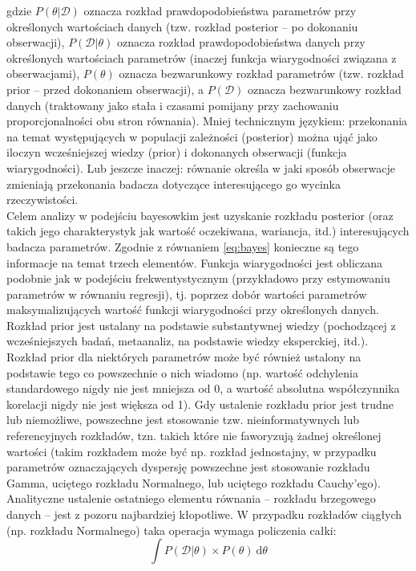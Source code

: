 \documentclass[man]{apa6}
\begin{document}
gdzie $P(\theta | \mathcal{D})$ oznacza rozkład prawdopodobieństwa parametrów przy określonych wartościach danych (tzw. rozkład posterior -- po dokonaniu obserwacji), $P(\mathcal{D} | \theta)$ oznacza rozkład prawdopodobieństwa danych przy określonych wartościach parametrów (inaczej funkcja wiarygodności związana z obserwacjami), $P(\theta)$ oznacza bezwarunkowy rozkład parametrów (tzw. rozkład prior -- przed dokonaniem obserwacji), a $P(\mathcal{D})$ oznacza bezwarunkowy rozkład danych (traktowany jako stała i czasami pomijany przy zachowaniu proporcjonalności obu stron równania). Mniej technicznym językiem: przekonania na temat występujących w populacji zależności (posterior) można ująć jako iloczyn wcześniejszej wiedzy (prior) i dokonanych obserwacji (funkcja wiarygodności). Lub jeszcze inaczej: równanie określa w jaki sposób obserwacje zmieniają przekonania badacza dotyczące interesującego go
wycinka rzeczywistości. \\
Celem analizy w podejściu bayesowkim jest uzyskanie rozkładu posterior (oraz takich jego charakterystyk jak wartość oczekiwana, wariancja, itd.) interesujących badacza parametrów. Zgodnie z równaniem \ref{eq:bayes} konieczne są tego informacje na temat trzech elementów. Funkcja wiarygodności jest obliczana podobnie jak w podejściu frekwentystycznym (przykładowo przy estymowaniu parametrów w równaniu regresji), tj. poprzez dobór wartości parametrów maksymalizujących wartość funkcji wiarygodności przy określonych danych. Rozkład prior jest ustalany na podstawie substantywnej wiedzy (pochodzącej z wcześniejszych badań, metaanaliz, na podstawie wiedzy eksperckiej, itd.). Rozkład prior dla niektórych parametrów może być również ustalony na podstawie tego co powszechnie o nich wiadomo (np. wartość odchylenia standardowego nigdy nie jest mniejsza od 0, a wartość absolutna współczynnika korelacji nigdy nie jest większa od 1). Gdy ustalenie rozkładu prior jest trudne lub niemożliwe, powszechne jest stosowanie tzw. nieinformatywnych lub referencyjnych rozkładów, tzn. takich które nie faworyzują żadnej określonej wartości (takim rozkładem może być np. rozkład jednostajny, w przypadku parametrów oznaczających dyspersję powszechne jest stosowanie rozkładu Gamma, uciętego rozkładu Normalnego, lub uciętego rozkładu Cauchy'ego).\\
Analityczne ustalenie ostatniego elementu równania -- rozkładu brzegowego danych -- jest z pozoru najbardziej kłopotliwe. W przypadku rozkładów ciągłych (np. rozkładu Normalnego) taka operacja wymaga policzenia całki:
\begin{equation}
    \int P(\mathcal{D} | \theta)\times P(\theta)\ \mathrm{d}\theta
\end{equation}
\end{document}
